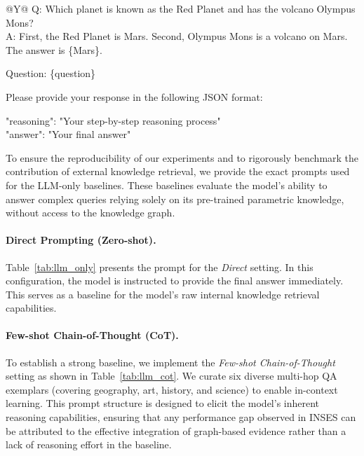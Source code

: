 \documentclass{article}
\theoremstyle{plain}
\theoremstyle{definition}
\theoremstyle{remark}
\begin{document}
\begin{table}[htb]
\begin{tabularx}{\textwidth}{@{}Y@{}}
    Q: Which planet is known as the Red Planet and has the volcano Olympus Mons?\\
    A: First, the Red Planet is Mars. Second, Olympus Mons is a volcano on Mars. The answer is \{Mars\}.\\

    \par\medskip
    Question: \{question\} \\
    
    \par\medskip
    Please provide your response in the following JSON format:\\
    
    \par\medskip
    "reasoning": "Your step-by-step reasoning process"\\  
    "answer": "Your final answer"\\

    \bottomrule
  \end{tabularx}
\end{table}

To ensure the reproducibility of our experiments and to rigorously benchmark the contribution of external knowledge retrieval, we provide the exact prompts used for the LLM-only baselines. These baselines evaluate the model's ability to answer complex queries relying solely on its pre-trained parametric knowledge, without access to the knowledge graph.

\paragraph{Direct Prompting (Zero-shot).}
Table~\ref{tab:llm_only} presents the prompt for the \textit{Direct} setting. In this configuration, the model is instructed to provide the final answer immediately. This serves as a baseline for the model's raw internal knowledge retrieval capabilities.

\paragraph{Few-shot Chain-of-Thought (CoT).}
To establish a strong baseline, we implement the \textit{Few-shot Chain-of-Thought} setting as shown in Table~\ref{tab:llm_cot}. We curate six diverse multi-hop QA exemplars (covering geography, art, history, and science) to enable in-context learning. This prompt structure is designed to elicit the model's inherent reasoning capabilities, ensuring that any performance gap observed in INSES can be attributed to the effective integration of graph-based evidence rather than a lack of reasoning effort in the baseline.
\end{document}
